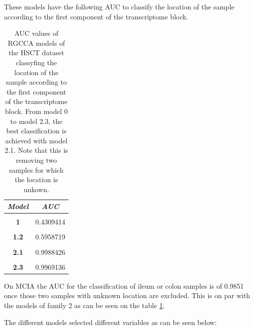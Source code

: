 \documentclass[
  12pt,
  a4paper,
  twoside,
  openright]{book}
\begin{document}
These models have the following AUC to classify the location of the sample according to the first component of the transcriptome block.

\begin{table}[H]

\caption[AUC values of RGCCA models on the HSCT dataset.]{\label{tab:hsct-auc}AUC values of RGCCA models of the HSCT dataset classyfing the location of the sample according to the first component of the transcriptome block. From model 0 to model 2.3, the best classification is achieved with model 2.1. Note that this is removing two samples for which the location is unkown.}
\centering
\begin{tabular}[t]{|>{}c|>{}c|}
\hline
\em{\textbf{Model}} & \em{\textbf{AUC}}\\
\hline
\textbf{\cellcolor{gray!6}{0}} & \cellcolor{gray!6}{0.4537037}\\
\hline
\textbf{1} & 0.4309414\\
\hline
\textbf{\cellcolor{gray!6}{1.1}} & \cellcolor{gray!6}{0.4639275}\\
\hline
\textbf{1.2} & 0.5958719\\
\hline
\textbf{\cellcolor{gray!6}{2}} & \cellcolor{gray!6}{0.9450231}\\
\hline
\textbf{2.1} & 0.9988426\\
\hline
\textbf{\cellcolor{gray!6}{2.2}} & \cellcolor{gray!6}{0.9980710}\\
\hline
\textbf{2.3} & 0.9969136\\
\hline
\end{tabular}
\end{table}

On MCIA the AUC for the classification of ileum or colon samples is of 0.9851 once those two samples with unknown location are excluded.
This is on par with the models of family 2 as can be seen on the table \ref{tab:hsct-auc}.

The different models selected different variables as can be seen below:
\end{document}
